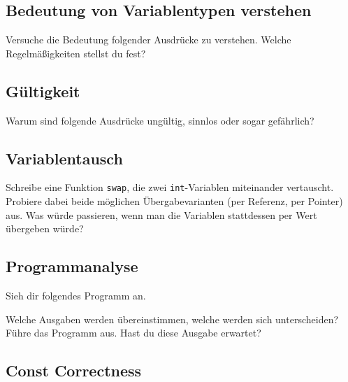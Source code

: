 \subsection{Bedeutung von Variablentypen verstehen}
Versuche die Bedeutung folgender Ausdrücke zu verstehen.
Welche Regelmäßigkeiten stellst du fest?



\subsection{Gültigkeit}
Warum sind folgende Ausdrücke ungültig, sinnlos oder sogar gefährlich?



\subsection{Variablentausch}
Schreibe eine Funktion \lstinline{swap}, die zwei \lstinline{int}-Variablen miteinander vertauscht.
Probiere dabei beide möglichen Übergabevarianten (per Referenz, per Pointer) aus.
Was würde passieren, wenn man die Variablen stattdessen per Wert übergeben würde?

\subsection{Programmanalyse}
Sieh dir folgendes Programm an.


Welche Ausgaben werden übereinstimmen, welche werden sich unterscheiden?
Führe das Programm aus.
Hast du diese Ausgabe erwartet?

\subsection{Const Correctness}

